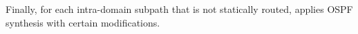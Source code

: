 
Finally, for each intra-domain subpath
 that is not statically routed, \name applies
OSPF synthesis with certain modifications.


